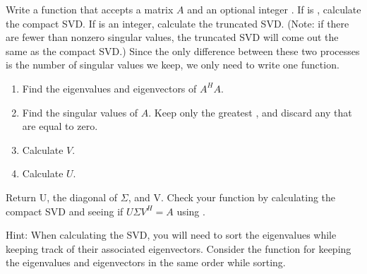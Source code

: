 \begin{problem}
Write a function  that accepts a matrix $A$ and an optional integer . 
If  is , calculate the compact SVD. If  is an integer, calculate the truncated SVD.
(Note: if there are fewer than  nonzero singular values, the truncated SVD will come out the same as the compact SVD.)
Since the only difference between these two processes is the number of singular values we keep, we only need to write one function.

\begin{enumerate}
\item Find the eigenvalues and eigenvectors of $A^H A$.
\item Find the singular values of $A$. Keep only the greatest , and discard any that are equal to zero.
\item Calculate $V$.
\item Calculate $U$.
\end{enumerate}

Return U, the diagonal of $\Sigma$, and V.
Check your function by calculating the compact SVD and seeing if $U\Sigma V^H = A$ using .

Hint: When calculating the SVD, you will need to sort the eigenvalues while keeping track of their associated eigenvectors. 
Consider the function  for keeping the eigenvalues and eigenvectors in the same order while sorting.
\label{prob:calc_svd}
\end{problem}

